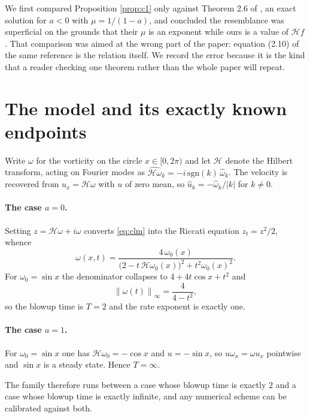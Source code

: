 \documentclass[11pt]{article}
\theoremstyle{definition}
\newcommand{\Hil}{\mathcal{H}}
\newcommand{\norm}[1]{\left\lVert #1 \right\rVert}
\newcommand{\abs}[1]{\left\lvert #1 \right\rvert}
\begin{document}
We first compared Proposition \ref{prop:c1} only against Theorem 2.6 of
\cite{htw2026}, an exact solution for $a<0$ with $\mu = 1/(1-a)$, and concluded
the resemblance was superficial on the grounds that their $\mu$ is an exponent
while ours is a value of $\Hil f$. That comparison was aimed at the wrong part
of the paper: equation (2.10) of the same reference is the relation itself. We
record the error because it is the kind that a reader checking one theorem
rather than the whole paper will repeat.

\section{The model and its exactly known endpoints}

Write $\omega$ for the vorticity on the circle $x \in [0,2\pi)$ and let
$\Hil$ denote the Hilbert transform, acting on Fourier modes as
$\widehat{\Hil\omega}_k = -i\,\mathrm{sgn}(k)\,\hat\omega_k$. The velocity is
recovered from $u_x = \Hil\omega$ with $u$ of zero mean, so
$\hat u_k = -\hat\omega_k/\abs{k}$ for $k\ne 0$.

\paragraph{The case $a=0$.} Setting $z = \Hil\omega + i\omega$ converts
\eqref{eq:clm} into the Riccati equation $z_t = z^2/2$, whence
\begin{equation}
  \omega(x,t) = \frac{4\,\omega_0(x)}
  {\bigl(2 - t\,\Hil\omega_0(x)\bigr)^2 + t^2\omega_0(x)^2}.
  \label{eq:clmexact}
\end{equation}
For $\omega_0 = \sin x$ the denominator collapses to $4 + 4t\cos x + t^2$ and
\begin{equation}
  \norm{\omega(t)}_\infty = \frac{4}{4-t^2},
  \label{eq:clmsup}
\end{equation}
so the blowup time is $T=2$ and the rate exponent is exactly one.

\paragraph{The case $a=1$.} For $\omega_0 = \sin x$ one has
$\Hil\omega_0 = -\cos x$ and $u = -\sin x$, so $u\omega_x = \omega u_x$
pointwise and $\sin x$ is a steady state. Hence $T=\infty$.

The family therefore runs between a case whose blowup time is exactly $2$ and a
case whose blowup time is exactly infinite, and any numerical scheme can be
calibrated against both.
\end{document}
